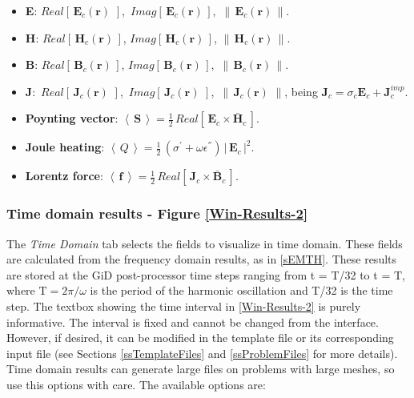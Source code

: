 \begin{itemize}\itemsep0.25em 
	\item \textbf{E}: $Real\left[\,\mathbf{E}_{c}(\mathbf{r})\,\,\right]$, $\,Imag\left[\,\mathbf{E}_{c}(\mathbf{r})\,\right]$, $\,\left\|\,\mathbf{E}_{c}(\mathbf{r})\,\right\|$.
	\quad
	\item \textbf{H}: $Real\left[\,\mathbf{H}_{c}(\mathbf{r})\,\right]$, $Imag\left[\,\mathbf{H}_{c}(\mathbf{r})\,\right]$, $\left\|\,\mathbf{H}_{c}(\mathbf{r})\,\right\|$.
	\quad
	\item \textbf{B}: $Real\left[\,\mathbf{B}_{c}(\mathbf{r})\,\right]$, $Imag\left[\,\mathbf{B}_{c}(\mathbf{r})\,\right]$, $\,\left\|\,\mathbf{B}_{c}(\mathbf{r})\,\right\|$.
	\quad
	\item \textbf{J}: $\,Real\left[\,\mathbf{J}_{c}(\mathbf{r})\,\,\right]$, $\,Imag\left[\,\mathbf{J}_{c}(\mathbf{r})\,\,\right]$, $\,\left\|\,\mathbf{J}_{c}(\mathbf{r})\,\,\right\|$, being $\mathbf{J}_{c} = \sigma_{c}\mathbf{E}_{c} + \mathbf{J}_{c}^{imp}$.
	\quad
	\item \textbf{Poynting vector}: $\left\langle\,\mathbf{S}\,\right\rangle = \frac{1}{2}\, Real\left[\,\mathbf{E}_{c}\times\mathbf{\bar{H}}_{c}\,\right]$.
	\quad
	\item \textbf{Joule heating}: $\left\langle\,Q\,\right\rangle =\frac{1}{2}\,\left(\sigma^{'} + \omega\epsilon^{''}\right)\,\left|\,\mathbf{E}_{c}\,\right|^{2}$.
	\quad
	\item \textbf{Lorentz force}: $\left\langle\,\mathbf{f}\,\right\rangle = \frac{1}{2}\, Real\left[\,\mathbf{J}_{c}\times\mathbf{\bar{B}}_{c}\,\right]$.
\end{itemize}

\subsubsection{Time domain results - Figure \ref{Win-Results-2}}

The \textit{Time Domain} tab selects the fields to visualize in time domain. These fields are calculated from the frequency domain results, as in \ref{sEMTH}. These results are stored at the GiD post-processor time steps ranging from t = T/32 to t = T, where $\text{T} = 2\pi/\omega$ is the period of the harmonic oscillation and T/32 is the time step. The textbox showing the time interval in \ref{Win-Results-2} is purely informative. The interval is fixed and cannot be changed from the interface. However, if desired, it can be modified in the template file  or its corresponding input file  (see Sections \ref{ssTemplateFiles} and \ref{ssProblemFiles} for more details). Time domain results can generate large files on problems with large meshes, so use this options with care. The available options are:

